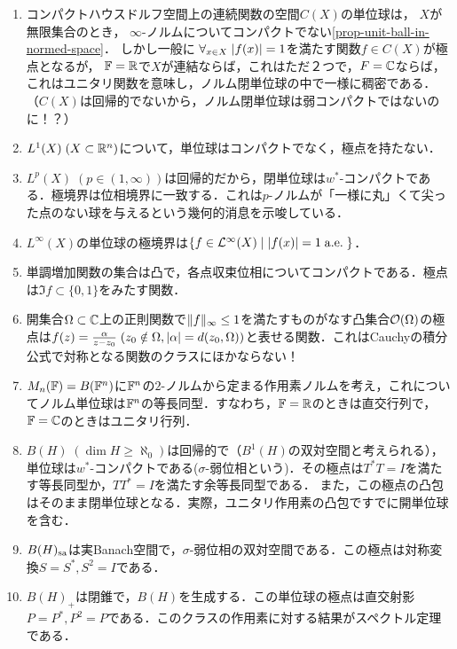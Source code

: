 \documentclass[uplatex,dvipdfmx]{jsreport}
\begin{document}
\begin{example}[凸集合の極点]\mbox{}
    \begin{enumerate}
        \item コンパクトハウスドルフ空間上の連続関数の空間$C(X)$の単位球は，
        $X$が無限集合のとき，
        $\infty$-ノルムについてコンパクトでない\ref{prop-unit-ball-in-normed-space}．
        しかし一般に
        $\forall_{x\in X}\;\lvert f(x)\rvert=1$を満たす関数$f\in C(X)$が極点となるが，
        $\mathbb{F}=\mathbb{R}$で$X$が連結ならば，これはただ２つで，$F=\mathbb{C}$ならば，これはユニタリ関数を意味し，ノルム閉単位球の中で一様に稠密である．
        （$C(X)$は回帰的でないから，ノルム閉単位球は弱コンパクトではないのに！？）
        \item $L^1(X)\;(X\subset\mathbb{R}^n)$について，単位球はコンパクトでなく，極点を持たない．
        \item $L^p(X)\;(p\in(1,\infty))$は回帰的だから，閉単位球は$w^*$-コンパクトである．極境界は位相境界に一致する．これは$p$-ノルムが「一様に丸」くて尖った点のない球を与えるという幾何的消息を示唆している．
        \item $L^\infty(X)$の単位球の極境界は$\left\{f\in \mathcal{L}^\infty(X)\mid\lvert f(x)\rvert=1\;\mathrm{a.e.}\;\right\}$．
        \item 単調増加関数の集合は凸で，各点収束位相についてコンパクトである．極点は$\Im f\subset\{0,1\}$をみたす関数．
        \item 開集合$\Omega\subset\mathbb{C}$上の正則関数で$\|f\|_\infty\le1$を満たすものがなす凸集合$\mathcal{O}(\Omega)$の極点は$f(z)=\frac{\alpha}{z-z_0}\;(z_0\notin\Omega,\lvert\alpha\rvert=d(z_0,\Omega))$と表せる関数．これはCauchyの積分公式で対称となる関数のクラスにほかならない！
        \item $M_n(\mathbb{F})=B(\mathbb{F}^n)$に$\mathbb{F}^n$の$2$-ノルムから定まる作用素ノルムを考え，これについてノルム単位球は$\mathbb{F}^n$の等長同型．すなわち，$\mathbb{F}=\mathbb{R}$のときは直交行列で，$\mathbb{F}=\mathbb{C}$のときはユニタリ行列．
        \item $B(H)\;(\dim H\ge\aleph_0)$は回帰的で（$B^1(H)$の双対空間と考えられる），単位球は$w^*$-コンパクトである($\sigma$-弱位相という)．その極点は$T^*T=I$を満たす等長同型か，$TT^*=I$を満たす余等長同型である．
        また，この極点の凸包はそのまま閉単位球となる．実際，ユニタリ作用素の凸包ですでに開単位球を含む．
        \item $B(H)_{\mathrm{sa}}$は実Banach空間で，$\sigma$-弱位相の双対空間である．この極点は対称変換$S=S^*,S^2=I$である．
        \item $B(H)_+$は閉錐で，$B(H)$を生成する．この単位球の極点は直交射影$P=P^*,P^2=P$である．このクラスの作用素に対する結果がスペクトル定理である．
    \end{enumerate}
\end{example}
\end{document}
